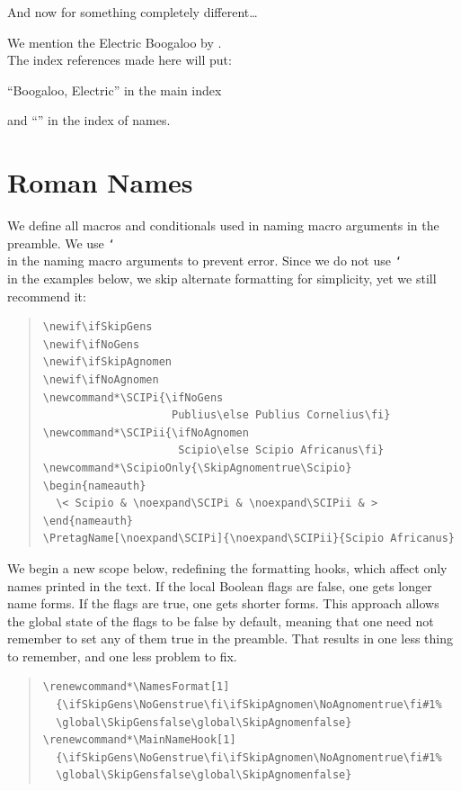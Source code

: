 \documentclass[oneside]{article}
\makeatletter
\newcounter{VerbLine}
\newif\ifSkipGens
\newif\ifNoGens
\newif\ifSkipAgnomen
\newif\ifNoAgnomen
\newcommand*\SCIPi{\ifNoGens
                    Publius\else Publius Cornelius\fi}
\newcommand*\SCIPii{\ifNoAgnomen
                     Scipio\else Scipio Africanus\fi}
\newcommand*\ScipioOnly{\SkipAgnomentrue\Scipio}
\def\cmd#1{\cs{\expandafter\cmd@to@cs\string#1}}
\def\cmd@to@cs#1#2{\char\number`#2\relax}
\DeclareRobustCommand\cs[1]{\texttt{\char`\\#1}}
\newcommand*\StartNum{\setcounter{VerbLine}{0}\def\verbatim@processline{\stepcounter{VerbLine}\leavevmode\llap{\footnotesize\normalfont\theVerbLine\quad}\the\verbatim@line\par}}
\newcommand*\ContinueNum{\def\verbatim@processline{\stepcounter{VerbLine}\leavevmode\llap{\footnotesize\normalfont\theVerbLine\quad}\the\verbatim@line\par}}
\makeatother
\begin{document}
\vfil
\noindent And now for something completely different\dots

  We mention the Electric Boogaloo
  by .\\

\noindent The index references made here will put:

  ``Boogaloo, Electric'' in the main index

  and ``'' in the index of names.
\newpage

\section{Roman Names}

 We define all macros and conditionals used in naming macro arguments in the preamble. We use \cmd{\noexpand} in the naming macro arguments to prevent error. Since we do not use \cmd{\CapThis} in the examples below, we skip alternate formatting for simplicity, yet we still recommend it:
 \begin{quote}\small
 \StartNum
 \begin{verbatim}
\newif\ifSkipGens
\newif\ifNoGens
\newif\ifSkipAgnomen
\newif\ifNoAgnomen
\newcommand*\SCIPi{\ifNoGens
                    Publius\else Publius Cornelius\fi}
\newcommand*\SCIPii{\ifNoAgnomen
                     Scipio\else Scipio Africanus\fi}
\newcommand*\ScipioOnly{\SkipAgnomentrue\Scipio}
\begin{nameauth}
  \< Scipio & \noexpand\SCIPi & \noexpand\SCIPii & >
\end{nameauth}
\PretagName[\noexpand\SCIPi]{\noexpand\SCIPii}{Scipio Africanus}\end{verbatim}
 \end{quote}

 We begin a new scope below, redefining the formatting hooks, which affect only names printed in the text. If the local Boolean flags are false, one gets longer name forms. If the flags are true, one gets shorter forms. This approach allows the global state of the flags to be false by default, meaning that one need not remember to set any of them true in the preamble. That results in one less thing to remember, and one less problem to fix.
\begingroup
\renewcommand*\NamesFormat[1]
  {\ifSkipGens\NoGenstrue\fi\ifSkipAgnomen\NoAgnomentrue\fi#1%
  \global\SkipGensfalse\global\SkipAgnomenfalse}
\renewcommand*\MainNameHook[1]
  {\ifSkipGens\NoGenstrue\fi\ifSkipAgnomen\NoAgnomentrue\fi#1%
  \global\SkipGensfalse\global\SkipAgnomenfalse}
 \begin{quote}\small
 \ContinueNum
 \begin{verbatim}
\renewcommand*\NamesFormat[1]
  {\ifSkipGens\NoGenstrue\fi\ifSkipAgnomen\NoAgnomentrue\fi#1%
  \global\SkipGensfalse\global\SkipAgnomenfalse}
\renewcommand*\MainNameHook[1]
  {\ifSkipGens\NoGenstrue\fi\ifSkipAgnomen\NoAgnomentrue\fi#1%
  \global\SkipGensfalse\global\SkipAgnomenfalse}\end{verbatim}
 \end{quote}
\end{document}
